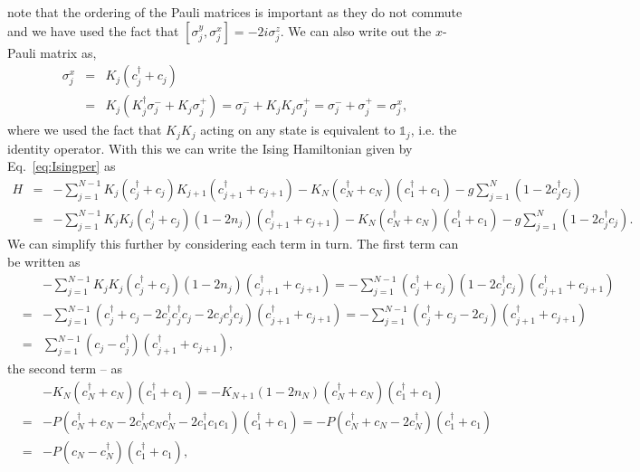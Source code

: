 note that the ordering of the Pauli matrices is important as they do not commute and we have used the fact that $[\sigma_j^y, \sigma_j^x] = -2i\sigma_j^z$. We can also write out the $x$-Pauli matrix as,
\begin{eqnarray}
\sigma_j^x & = & K_j \left( c_j^\dagger + c_j \right) \\ \nonumber
& = & K_j \left(  K_j^\dagger \sigma_j^- + K_j \sigma_j^+ \right) = \sigma_j^- + K_j K_j \sigma_j^+ = \sigma_j^- + \sigma_j^+ = \sigma_j^x,
\end{eqnarray}
where we used the fact that $K_j K_j$ acting on any state is equivalent to $\mathds{1}_j$, i.e. the identity operator. With this we can write the Ising Hamiltonian given by Eq.~\eqref{eq:Isingper} as
\begin{eqnarray}\label{eq:intermediateH}
H & = & - \sum_{j=1}^{N-1} K_j \left( c_j^\dagger + c_j \right) K_{j+1} \left( c_{j+1}^\dagger + c_{j+1} \right) - K_N \left( c_N^\dagger + c_N \right) \left( c_{1}^\dagger + c_{1} \right) - g  \sum_{j=1}^{N} \left( 1 - 2 c_j^\dagger c_j \right) \nonumber \\ 
& = & - \sum_{j=1}^{N-1} K_j K_j \left( c_j^\dagger + c_j \right) \left(1-2n_j\right) \left( c_{j+1}^\dagger + c_{j+1} \right) - K_N \left( c_N^\dagger + c_N \right) \left( c_{1}^\dagger + c_{1} \right) - g  \sum_{j=1}^{N} \left( 1 - 2 c_j^\dagger c_j \right). 
\end{eqnarray}
We can simplify this further by considering each term in turn. The first term can be written as
\begin{eqnarray}
& & - \sum_{j=1}^{N-1} K_j K_j \left( c_j^\dagger + c_j \right)  \left(1-2n_j\right)\left( c_{j+1}^\dagger + c_{j+1} \right) = - \sum_{j=1}^{N-1} \left( c_j^\dagger + c_j \right) \left(1-2 c^\dagger_j c_j\right) \left( c_{j+1}^\dagger + c_{j+1} \right) \nonumber \\
& = & - \sum_{j=1}^{N-1} \left( c_j^\dagger + c_j - 2 c_j^\dagger c^\dagger_j c_j - 2 c_j c^\dagger_j c_j \right) \left( c_{j+1}^\dagger + c_{j+1} \right) = - \sum_{j=1}^{N-1} \left( c_j^\dagger + c_j - 2 c_j \right) \left( c_{j+1}^\dagger + c_{j+1} \right) \nonumber \\
& = & \sum_{j=1}^{N-1} \left( c_j - c_j^\dagger \right) \left( c_{j+1}^\dagger + c_{j+1} \right), 
\end{eqnarray}
the second term -- as
\begin{eqnarray}
& & - K_N \left( c_N^\dagger + c_N \right) \left( c_{1}^\dagger + c_{1} \right) = - K_{N+1} \left (1-2 n_N \right) \left( c_N^\dagger + c_N \right) \left( c_{1}^\dagger + c_{1} \right) \nonumber \\
& = & - P \left( c_N^\dagger + c_N - 2 c_N^\dagger c_N c_N^\dagger - 2 c_1^\dagger c_1 c_1 \right) \left( c_{1}^\dagger + c_{1} \right) = - P \left( c_N^\dagger + c_N - 2 c_N^\dagger \right) \left( c_{1}^\dagger + c_{1} \right) \nonumber \\ & = & - P \left( c_N - c_N^\dagger \right) \left( c_{1}^\dagger + c_{1} \right), 
\end{eqnarray}
